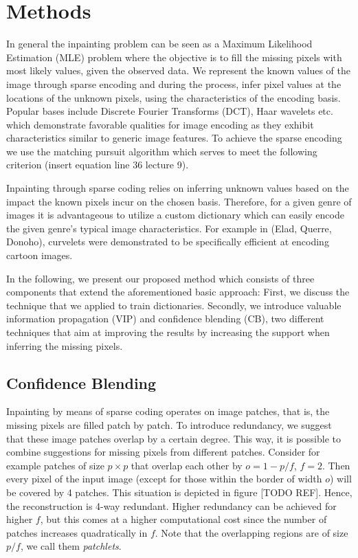 \section{Methods}
\label{sec:methods}

In general the inpainting problem can be seen as a Maximum Likelihood Estimation (MLE) problem where the objective is to fill the missing pixels with most likely values, given the observed data. We represent the known values of the image through sparse encoding and during the process, infer pixel values at the locations of the unknown pixels, using the characteristics of the encoding basis. Popular bases include Discrete Fourier Transforms (DCT), Haar wavelets etc. which demonstrate favorable qualities for image encoding as they exhibit characteristics similar to generic image features. To achieve the sparse encoding we use the matching pursuit algorithm which serves to meet the following criterion (insert equation line 36 lecture 9).

Inpainting through sparse coding relies on inferring unknown values based on the impact the known pixels incur on the chosen basis. Therefore, for a given genre of images it is advantageous to utilize a custom dictionary which can easily encode the given genre's typical image characteristics. For example  in (Elad, Querre, Donoho), curvelets were demonstrated to be specifically efficient at encoding cartoon images.

In the following, we present our proposed method which consists of three components that extend the aforementioned basic approach: First, we discuss the technique that we applied to train dictionaries. Secondly, we introduce valuable information propagation (VIP) and confidence blending (CB), two different techniques that aim at improving the results by increasing the support when inferring the missing pixels.

\subsection{Confidence Blending}
Inpainting by means of sparse coding operates on image patches, that is, the missing pixels are filled patch by patch. To introduce redundancy, we suggest that these image patches overlap by a certain degree. This way, it is possible to combine suggestions for missing pixels from different patches. Consider for example patches of size $p\times p$ that overlap each other by $o=1-p/f$, $f=2$. Then every pixel of the input image (except for those within the border of width $o$) will be covered by 4 patches. This situation is depicted in figure [TODO REF]. Hence, the reconstruction is 4-way redundant. Higher redundancy can be achieved for higher $f$, but this comes at a higher computational cost since the number of patches increases quadratically in $f$. Note that the overlapping regions are of size $p/f$, we call them \textit{patchlets}.

